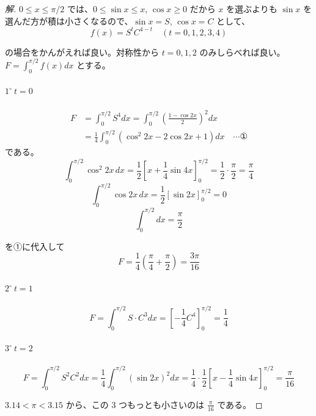 \documentclass[../main.tex]{subfiles}
\begin{document}
\begin{proof}[解]
  $0 \le x \le \pi/2$ では、$0 \le \sin x \le x$, $\cos x \ge 0$ だから $x$ を選ぶよりも $\sin x$ を選んだ方が積は小さくなるので、$\sin x = S$, $\cos x = C$ として、
  \[
    f(x) = S^t C^{4-t} \quad (t = 0, 1, 2, 3, 4)
  \]

  の場合をかんがえれば良い。対称性から $t=0, 1, 2$ のみしらべれば良い。$F = \int_0^{\pi/2} f(x) dx$ とする。

  \paragraph{$1^\circ \ t=0$}
  \begin{align*}
    F &= \int_0^{\pi/2} S^4 dx = \int_0^{\pi/2} \left(\frac{1 - \cos 2x}{2}\right)^2 dx \\
    &= \frac{1}{4} \int_0^{\pi/2} (\cos^2 2x - 2\cos 2x + 1) dx \quad \cdots \text{①}
  \end{align*}
  である。
  \[
    \int_0^{\pi/2} \cos^2 2x \, dx = \frac{1}{2} \left[ x + \frac{1}{4} \sin 4x \right]_0^{\pi/2} = \frac{1}{2} \cdot \frac{\pi}{2} = \frac{\pi}{4}
  \]
  \[
    \int_0^{\pi/2} \cos 2x \, dx = \frac{1}{2} [\sin 2x]_0^{\pi/2} = 0
  \]
  \[
    \int_0^{\pi/2} dx = \frac{\pi}{2}
  \]

  を①に代入して
  \[
    F = \frac{1}{4} \left( \frac{\pi}{4} + \frac{\pi}{2} \right) = \frac{3\pi}{16}
  \]

  \paragraph{$2^\circ \ t=1$}
  \[
    F = \int_0^{\pi/2} S \cdot C^3 dx = \left[ -\frac{1}{4} C^4 \right]_0^{\pi/2} = \frac{1}{4}
  \]

  \paragraph{$3^\circ \ t=2$}
  \[
    F = \int_0^{\pi/2} S^2 C^2 dx = \frac{1}{4} \int_0^{\pi/2} (\sin 2x)^2 dx = \frac{1}{4} \cdot \frac{1}{2} \left[ x - \frac{1}{4} \sin 4x \right]_0^{\pi/2} = \frac{\pi}{16}
  \]

  $3.14 < \pi < 3.15$ から、この $3$ つもっとも小さいのは $\frac{\pi}{16}$ である。
\end{proof}
\end{document}
